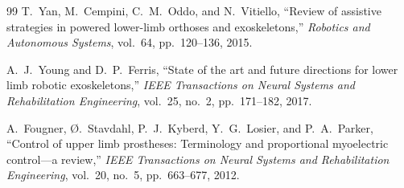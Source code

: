\documentclass[11pt,a4paper]{article}
\begin{document}
\begin{thebibliography}{99}
T.~Yan, M.~Cempini, C.~M.~Oddo, and N.~Vitiello, ``Review of assistive strategies in powered lower-limb orthoses and exoskeletons,'' \textit{Robotics and Autonomous Systems}, vol.~64, pp.~120--136, 2015.

A.~J.~Young and D.~P.~Ferris, ``State of the art and future directions for lower limb robotic exoskeletons,'' \textit{IEEE Transactions on Neural Systems and Rehabilitation Engineering}, vol.~25, no.~2, pp.~171--182, 2017.

A.~Fougner, \O.~Stavdahl, P.~J.~Kyberd, Y.~G.~Losier, and P.~A.~Parker, ``Control of upper limb prostheses: Terminology and proportional myoelectric control---a review,'' \textit{IEEE Transactions on Neural Systems and Rehabilitation Engineering}, vol.~20, no.~5, pp.~663--677, 2012.
\end{thebibliography}
\end{document}
